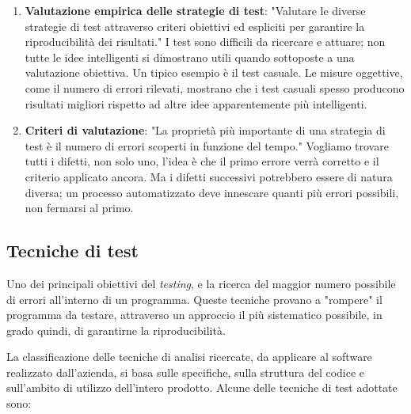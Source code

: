 \begin{enumerate}
\item \textbf{Valutazione empirica delle strategie di test}: "Valutare le diverse strategie di test attraverso criteri obiettivi ed espliciti per garantire la riproducibilità dei risultati." I test sono difficili da ricercare e attuare; non tutte le idee intelligenti si dimostrano utili quando sottoposte a una valutazione obiettiva. Un tipico esempio è il test casuale. Le misure oggettive, come il numero di errori rilevati, mostrano che i test casuali spesso producono risultati migliori rispetto ad altre idee apparentemente più intelligenti.

\item \textbf{Criteri di valutazione}: "La proprietà più importante di una strategia di test è il numero di errori scoperti in funzione del tempo." Vogliamo trovare tutti i difetti, non solo uno, l'idea è che il primo errore verrà corretto e il criterio applicato ancora. Ma i difetti successivi potrebbero essere di natura diversa; un processo automatizzato deve innescare quanti più errori possibili, non fermarsi al primo. 

\end{enumerate}

\subsection{Tecniche di test}
Uno dei principali obiettivi del \textit{ testing}, e la ricerca del maggior numero possibile di errori all'interno di un programma. Queste tecniche provano a "rompere" il programma da testare, attraverso un approccio il più sistematico possibile, in grado quindi, di garantirne la riproducibilità. 

La classificazione delle tecniche di analisi ricercate, da applicare al software realizzato dall'azienda,  si basa sulle specifiche, sulla struttura del codice e sull'ambito di utilizzo dell'intero prodotto. Alcune delle tecniche di test adottate sono:

